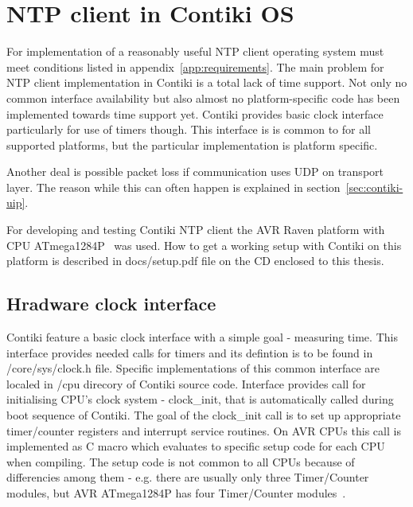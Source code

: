 
\chapter{NTP client in Contiki OS}

For implementation of a reasonably useful NTP client
operating system must meet conditions listed in appendix~\ref{app:requirements}.
The main problem for NTP client implementation in Contiki is a total
lack of time support.
Not only no common interface availability but also
almost no platform-specific code has been implemented towards time support yet.
Contiki provides basic clock interface particularly for use of timers though.
This interface is is common to for all supported platforms, but the particular implementation
is platform specific.

Another deal is possible packet loss if communication uses UDP on transport layer.
The reason while this can often happen is explained in section~\ref{sec:contiki-uip}.

For developing and testing Contiki NTP client the AVR Raven platform with CPU ATmega1284P~\cite{avr-datasheet} was used.
How to get a working setup with Contiki on this platform is described in
docs/setup.pdf file on the CD enclosed to this thesis.

\section{Hradware clock interface}
Contiki feature a basic clock interface with a simple goal - measuring time.
This interface provides needed calls for timers and its defintion is to be found in /core/sys/clock.h file.
Specific implementations of this common interface are localed in /cpu direcory of Contiki source code.
Interface provides call for initialising CPU's clock system - clock\_init, that is automatically called during
boot sequence of Contiki.
The goal of the clock\_init call is to set up
appropriate timer/counter registers and interrupt service routines.
On AVR CPUs this call is implemented as C macro which evaluates to specific setup code for each CPU
when compiling.
The setup code is not common to all CPUs because of differencies among them - e.g. there are usually
only three Timer/Counter modules, but AVR ATmega1284P has four Timer/Counter modules~\cite{avr-datasheet}.


